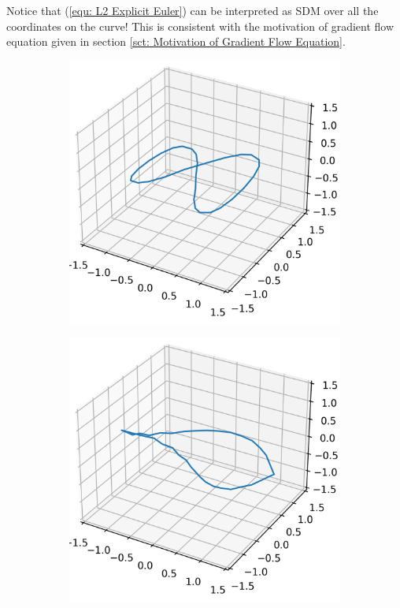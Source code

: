 \documentclass[../dissertation.tex]{subfiles}
\begin{document}
\begin{remark}
Notice that (\ref{equ: L2 Explicit Euler}) can be interpreted as SDM over all the coordinates on the curve!
This is consistent with the motivation of gradient flow equation given in section \ref{sct: Motivation of Gradient Flow Equation}.
\end{remark}

\begin{figure}[tbp]
    \centering
    \begin{subfigure}[b]{0.32\textwidth}
        \centering
        \includegraphics[width=\textwidth]{sections/unknottingCurveImgs/figure8-L2-0}
    \end{subfigure}
    \begin{subfigure}[b]{0.32\textwidth}
        \centering
        \includegraphics[width=\textwidth]{sections/unknottingCurveImgs/figure8-L2-1}

\end{subfigure}
\end{figure}
\end{document}
